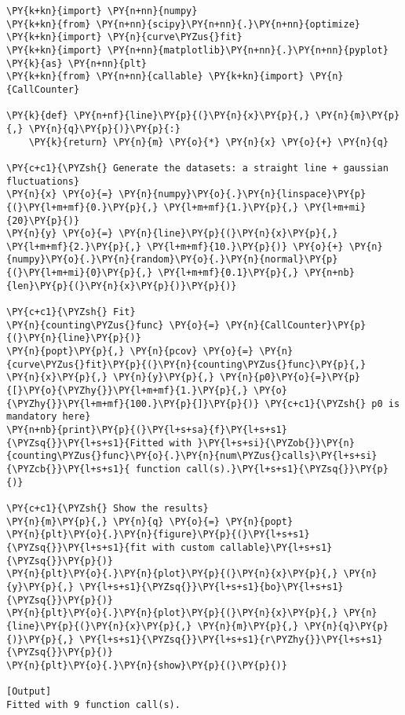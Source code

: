 \begin{Verbatim}[label=\makebox{\url{https://github.com/lucabaldini/cmepda/tree/master/slides/latex/snippets/test\_callable.py}},commandchars=\\\{\}]
\PY{k+kn}{import} \PY{n+nn}{numpy}
\PY{k+kn}{from} \PY{n+nn}{scipy}\PY{n+nn}{.}\PY{n+nn}{optimize} \PY{k+kn}{import} \PY{n}{curve\PYZus{}fit}
\PY{k+kn}{import} \PY{n+nn}{matplotlib}\PY{n+nn}{.}\PY{n+nn}{pyplot} \PY{k}{as} \PY{n+nn}{plt}
\PY{k+kn}{from} \PY{n+nn}{callable} \PY{k+kn}{import} \PY{n}{CallCounter}

\PY{k}{def} \PY{n+nf}{line}\PY{p}{(}\PY{n}{x}\PY{p}{,} \PY{n}{m}\PY{p}{,} \PY{n}{q}\PY{p}{)}\PY{p}{:}
    \PY{k}{return} \PY{n}{m} \PY{o}{*} \PY{n}{x} \PY{o}{+} \PY{n}{q}

\PY{c+c1}{\PYZsh{} Generate the datasets: a straight line + gaussian fluctuations}
\PY{n}{x} \PY{o}{=} \PY{n}{numpy}\PY{o}{.}\PY{n}{linspace}\PY{p}{(}\PY{l+m+mf}{0.}\PY{p}{,} \PY{l+m+mf}{1.}\PY{p}{,} \PY{l+m+mi}{20}\PY{p}{)}
\PY{n}{y} \PY{o}{=} \PY{n}{line}\PY{p}{(}\PY{n}{x}\PY{p}{,} \PY{l+m+mf}{2.}\PY{p}{,} \PY{l+m+mf}{10.}\PY{p}{)} \PY{o}{+} \PY{n}{numpy}\PY{o}{.}\PY{n}{random}\PY{o}{.}\PY{n}{normal}\PY{p}{(}\PY{l+m+mi}{0}\PY{p}{,} \PY{l+m+mf}{0.1}\PY{p}{,} \PY{n+nb}{len}\PY{p}{(}\PY{n}{x}\PY{p}{)}\PY{p}{)}

\PY{c+c1}{\PYZsh{} Fit}
\PY{n}{counting\PYZus{}func} \PY{o}{=} \PY{n}{CallCounter}\PY{p}{(}\PY{n}{line}\PY{p}{)}
\PY{n}{popt}\PY{p}{,} \PY{n}{pcov} \PY{o}{=} \PY{n}{curve\PYZus{}fit}\PY{p}{(}\PY{n}{counting\PYZus{}func}\PY{p}{,} \PY{n}{x}\PY{p}{,} \PY{n}{y}\PY{p}{,} \PY{n}{p0}\PY{o}{=}\PY{p}{[}\PY{o}{\PYZhy{}}\PY{l+m+mf}{1.}\PY{p}{,} \PY{o}{\PYZhy{}}\PY{l+m+mf}{100.}\PY{p}{]}\PY{p}{)} \PY{c+c1}{\PYZsh{} p0 is mandatory here}
\PY{n+nb}{print}\PY{p}{(}\PY{l+s+sa}{f}\PY{l+s+s1}{\PYZsq{}}\PY{l+s+s1}{Fitted with }\PY{l+s+si}{\PYZob{}}\PY{n}{counting\PYZus{}func}\PY{o}{.}\PY{n}{num\PYZus{}calls}\PY{l+s+si}{\PYZcb{}}\PY{l+s+s1}{ function call(s).}\PY{l+s+s1}{\PYZsq{}}\PY{p}{)}

\PY{c+c1}{\PYZsh{} Show the results}
\PY{n}{m}\PY{p}{,} \PY{n}{q} \PY{o}{=} \PY{n}{popt}
\PY{n}{plt}\PY{o}{.}\PY{n}{figure}\PY{p}{(}\PY{l+s+s1}{\PYZsq{}}\PY{l+s+s1}{fit with custom callable}\PY{l+s+s1}{\PYZsq{}}\PY{p}{)}
\PY{n}{plt}\PY{o}{.}\PY{n}{plot}\PY{p}{(}\PY{n}{x}\PY{p}{,} \PY{n}{y}\PY{p}{,} \PY{l+s+s1}{\PYZsq{}}\PY{l+s+s1}{bo}\PY{l+s+s1}{\PYZsq{}}\PY{p}{)}
\PY{n}{plt}\PY{o}{.}\PY{n}{plot}\PY{p}{(}\PY{n}{x}\PY{p}{,} \PY{n}{line}\PY{p}{(}\PY{n}{x}\PY{p}{,} \PY{n}{m}\PY{p}{,} \PY{n}{q}\PY{p}{)}\PY{p}{,} \PY{l+s+s1}{\PYZsq{}}\PY{l+s+s1}{r\PYZhy{}}\PY{l+s+s1}{\PYZsq{}}\PY{p}{)}
\PY{n}{plt}\PY{o}{.}\PY{n}{show}\PY{p}{(}\PY{p}{)}

[Output]
Fitted with 9 function call(s).
\end{Verbatim}